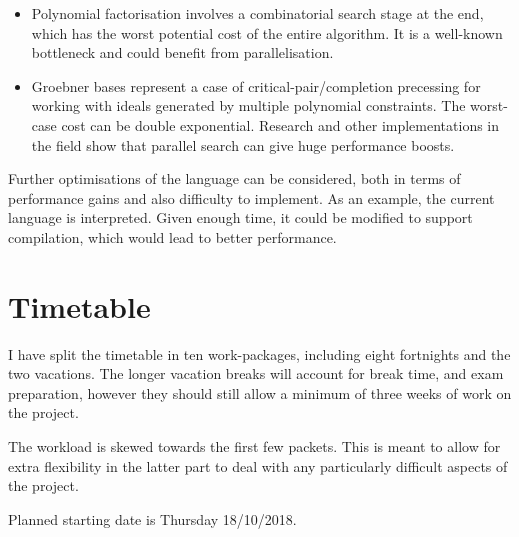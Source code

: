 \documentclass[12pt,a4paper,twoside]{article}
\begin{document}
\begin{itemize}
  \item Polynomial factorisation involves a combinatorial search stage at the
    end, which has the worst potential cost of the entire algorithm. It is a
    well-known bottleneck and could benefit from parallelisation.
  \item Groebner bases represent a case of critical-pair/completion precessing
    for working with ideals generated by multiple polynomial constraints.
    The worst-case cost can be double exponential. Research and other
    implementations in the field show that parallel search can give huge
    performance boosts.

\end{itemize}

Further optimisations of the language can be considered, both in terms of
performance gains and also difficulty to implement.
As an example, the current language is interpreted. Given enough time,
it could be modified to support compilation, which would lead to better performance.

\section*{Timetable}

I have split the timetable in ten work-packages, including eight fortnights and the two
vacations. The longer vacation breaks will account for break time, and exam preparation,
however they should still allow a minimum of three weeks of work on the project.

The workload is skewed towards the first few packets. This is meant to allow for extra
flexibility in the latter part to deal with any particularly difficult aspects of the project.

Planned starting date is Thursday 18/10/2018.
\end{document}
